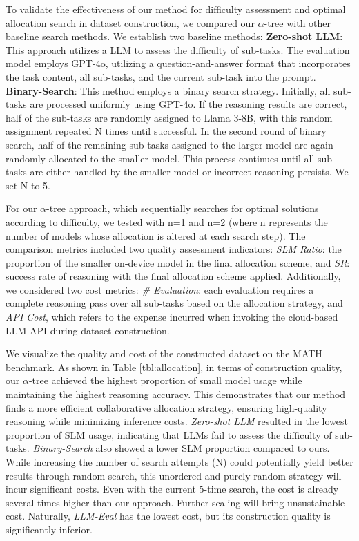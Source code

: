 To validate the effectiveness of our method for difficulty assessment and optimal allocation search in dataset construction, we compared our $\alpha$-tree with other baseline search methods. We establish two baseline methods: \textbf{Zero-shot LLM}: This approach utilizes a LLM to assess the difficulty of sub-tasks. The evaluation model employs GPT-4o, utilizing a question-and-answer format that incorporates the task content, all sub-tasks, and the current sub-task into the prompt. \textbf{Binary-Search}: This method employs a binary search strategy. Initially, all sub-tasks are processed uniformly using GPT-4o. If the reasoning results are correct, half of the sub-tasks are randomly assigned to Llama 3-8B, with this random assignment repeated N times until successful. In the second round of binary search, half of the remaining sub-tasks assigned to the larger model are again randomly allocated to the smaller model. This process continues until all sub-tasks are either handled by the smaller model or incorrect reasoning persists. We set N to 5.

For our $\alpha$-tree approach, which sequentially searches for optimal solutions according to difficulty, we tested with n=1 and n=2 (where n represents the number of models whose allocation is altered at each search step). The comparison metrics included two quality assessment indicators: \textit{SLM Ratio}: the proportion of the smaller on-device model in the final allocation scheme, and \textit{SR}: success rate of reasoning with the final allocation scheme applied. Additionally, we considered two cost metrics: \textit{\# Evaluation}: each evaluation requires a complete reasoning pass over all sub-tasks based on the allocation strategy, and \textit{API Cost}, which refers to the expense incurred when invoking the cloud-based LLM API during dataset construction.

We visualize the quality and cost of the constructed dataset on the MATH benchmark. As shown in Table \ref{tbl:allocation}, in terms of construction quality, our $\alpha$-tree achieved the highest proportion of small model usage while maintaining the highest reasoning accuracy. This demonstrates that our method finds a more efficient collaborative allocation strategy, ensuring high-quality reasoning while minimizing inference costs. \textit{Zero-shot LLM} resulted in the lowest proportion of SLM usage, indicating that LLMs fail to assess the difficulty of sub-tasks. \textit{Binary-Search} also showed a lower SLM proportion compared to ours. While increasing the number of search attempts (N) could potentially yield better results through random search, this unordered and purely random strategy will incur significant costs. Even with the current 5-time search, the cost is already several times higher than our approach. Further scaling will bring unsustainable cost. Naturally, \textit{LLM-Eval} has the lowest cost, but its construction quality is significantly inferior.

